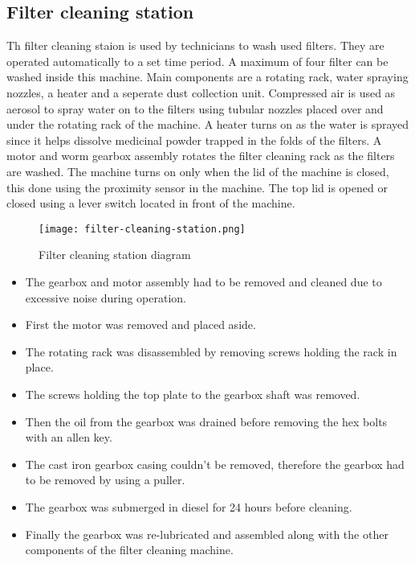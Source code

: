 \documentclass[a4paper,12pt]{article}
\begin{document}
			
		\newpage
		\subsection{Filter cleaning station}
		Th filter cleaning staion is used by technicians to wash used filters. They are operated automatically to a set time period.
		A maximum of four filter can be washed inside this machine. Main components are a rotating rack, water spraying nozzles, a heater and a seperate dust collection unit.
		Compressed air is used as aerosol to spray water on to the filters using tubular nozzles placed over and under the rotating rack of the machine.
		A heater turns on as the water is sprayed since it helps dissolve medicinal powder trapped in the folds of the filters.
		A motor and worm gearbox assembly rotates the filter cleaning rack as the filters are washed.
		The machine turns on only when the lid of the machine is closed, this done using the proximity sensor in the machine.
		The top lid is opened or closed using a lever switch located in front of the machine. 
			\begin{figure}[H]
				\centering
				\texttt{[image: filter-cleaning-station.png]}
				\caption{Filter cleaning station diagram}
				\label{fig:filter-cleaning-station}
			\end{figure}
		\begin{itemize}
			\item The gearbox and motor assembly had to be removed and cleaned due to excessive noise during operation.
			\item First the motor was removed and placed aside.
			\item The rotating rack was disassembled by removing screws holding the rack in place.
			\item The screws holding the top plate to the gearbox shaft was removed.
			\item Then the oil from the gearbox was drained before removing the hex bolts with an allen key.
			\item The cast iron gearbox casing couldn't be removed, therefore the gearbox had to be removed by using a puller.
			\item The gearbox was submerged in diesel for 24 hours before cleaning.
			\item Finally the gearbox was re-lubricated and assembled along with the other components of the filter cleaning machine. 
			 
		\end{itemize}
		 
\end{document}
